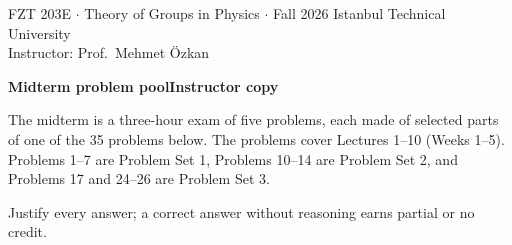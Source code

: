 \documentclass[11pt,a4paper]{article}
\begin{document}
\ifdefined\withsolutions\fi

{\small FZT 203E $\cdot$ Theory of Groups in Physics $\cdot$ Fall 2026 \hfill Istanbul Technical University\\
Instructor: Prof.\ Mehmet Özkan}

\vspace{0.9em}
{\LARGE\bfseries Midterm problem pool}\ifdefined\withsolutions\hfill{\large\bfseries Instructor copy}\fi

\vspace{0.5em}
The midterm is a three-hour exam of five problems, each made of selected parts of one of the 35 problems below. The problems cover Lectures 1--10 (Weeks 1--5). Problems 1--7 are Problem Set 1, Problems 10--14 are Problem Set 2, and Problems 17 and 24--26 are Problem Set 3.

Justify every answer; a correct answer without reasoning earns partial or no credit.
\end{document}
